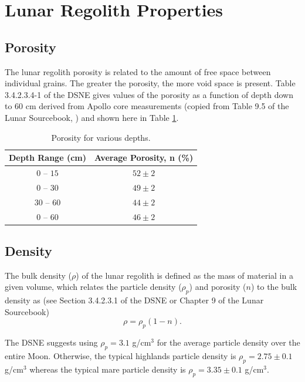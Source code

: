 \documentclass{article}
\begin{document}
\section{Lunar Regolith Properties}

\subsection{Porosity}

The lunar regolith porosity is related to the amount of free space between individual grains. The greater the porosity, the more void space is present. Table 3.4.2.3.4-1 of the DSNE gives values of the porosity as a function of depth down to $60$ cm derived from Apollo core measurements (copied from Table 9.5 of the Lunar Sourcebook, \cite{heiken1991lunar}) and shown here in Table \ref{tab:porosity}.


\begin{table}[!htb]
	\begin{center}
		\caption{Porosity for various depths.}
		\label{tab:porosity}
		\begin{tabular}{c c}
			\hline
			Depth Range (cm)  & Average Porosity, n (\%)  \\
			\hline
			$0$ -- $15$  & $52\pm 2$  \\
			$0$ -- $30$  & $49\pm 2$   \\
			$30$ -- $60$ & $44\pm 2$   \\
			$0$ -- $60$  & $46\pm 2$  \\\hline
		\end{tabular}
	\end{center}
\end{table}


\subsection{Density}

The bulk density ($\rho$) of the lunar regolith is defined as the mass of material in a given volume, which relates the particle density ($\rho_p$) and porosity ($n$) to the bulk density as (see Section 3.4.2.3.1 of the DSNE or Chapter 9 of the Lunar Sourcebook)
\begin{equation}
\rho = \rho_p(1-n).
\end{equation}

The DSNE suggests using $\rho_p = 3.1$ g/cm$^3$ for the average particle density over the entire Moon. Otherwise, the typical highlands particle density is $\rho_p = 2.75\pm 0.1$ g/cm$^3$ whereas the typical mare particle density is $\rho_p = 3.35\pm 0.1$ g/cm$^3$.
\end{document}
